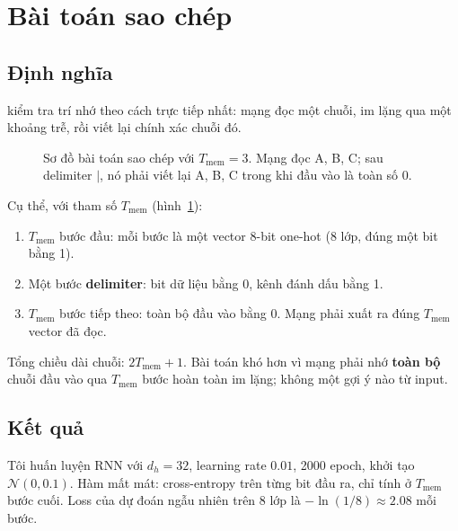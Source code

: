%

\section{Bài toán sao chép}
\label{sec:ch02-copy}

%

\subsection{Định nghĩa}

 kiểm tra trí nhớ theo cách trực tiếp nhất:
mạng đọc một
chuỗi, im lặng qua một khoảng trễ, rồi viết lại chính xác chuỗi đó.

\begin{figure}[ht]
  \centering
  
  \caption{Sơ đồ bài toán sao chép với $T_{\text{mem}} = 3$. Mạng đọc A, B, C;
    sau delimiter $|$, nó phải viết lại A, B, C trong khi đầu vào là toàn số 0.}
  \label{fig:ch02-copy-schema}
\end{figure}

Cụ thể, với tham số $T_{\text{mem}}$ (hình~\ref{fig:ch02-copy-schema}):
\begin{enumerate}
  \item $T_{\text{mem}}$ bước đầu: mỗi bước là một vector 8-bit one-hot (8
    lớp, đúng một bit bằng 1).
  \item Một bước \textbf{delimiter}: bit dữ liệu bằng 0, kênh đánh dấu bằng 1.
  \item $T_{\text{mem}}$ bước tiếp theo: toàn bộ đầu vào bằng 0. Mạng phải
    xuất ra đúng $T_{\text{mem}}$ vector đã đọc.
\end{enumerate}

Tổng chiều dài chuỗi: $2T_{\text{mem}} + 1$. Bài toán khó hơn
vì mạng phải nhớ \textbf{toàn bộ} chuỗi đầu vào qua $T_{\text{mem}}$ bước
hoàn toàn im lặng; không một gợi ý nào từ input.

\subsection{Kết quả}

Tôi huấn luyện RNN với $d_h = 32$, learning rate $0.01$, 2000 epoch, khởi tạo
$\mathcal{N}(0, 0.1)$. Hàm mất mát: cross-entropy trên từng bit đầu ra, chỉ
tính ở $T_{\text{mem}}$ bước cuối. Loss của dự đoán ngẫu nhiên trên 8 lớp là
$-\ln(1/8) \approx 2.08$ mỗi bước.

